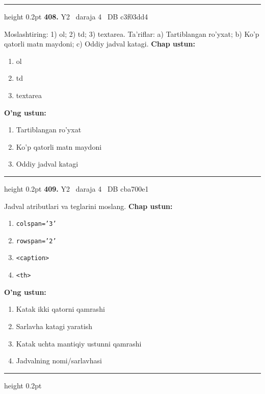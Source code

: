 \documentclass[10pt,a4paper,oneside]{article}
\begin{document}
\vspace{2mm}\hrule height 0.2pt \vspace{4mm}
\hypertarget{q408}{\textbf{\color{ink}408.}}  {\color{muted}\scriptsize Y2 \textbullet\ daraja 4 \textbullet\ DB c3f03dd4}
\par
Moslashtiring: 1) ol; 2) td; 3) textarea. Ta'riflar: a) Tartiblangan ro'yxat; b) Ko'p qatorli matn maydoni; c) Oddiy jadval katagi.
\textbf{\footnotesize Chap ustun:}
\begin{enumerate}[label=\arabic*),leftmargin=9mm]
\item ol
\item td
\item textarea
\end{enumerate}
\textbf{\footnotesize O'ng ustun:}
\begin{enumerate}[label=\Alph*),leftmargin=9mm]
\item Tartiblangan ro'yxat
\item Ko'p qatorli matn maydoni
\item Oddiy jadval katagi
\end{enumerate}
\vspace{2mm}\hrule height 0.2pt \vspace{4mm}
\hypertarget{q409}{\textbf{\color{ink}409.}}  {\color{muted}\scriptsize Y2 \textbullet\ daraja 4 \textbullet\ DB cba700e1}
\par
Jadval atributlari va teglarini moslang.
\textbf{\footnotesize Chap ustun:}
\begin{enumerate}[label=\arabic*),leftmargin=9mm]
\item \texttt{colspan='3'}
\item \texttt{rowspan='2'}
\item \texttt{\textless{}caption\textgreater{}}
\item \texttt{\textless{}th\textgreater{}}
\end{enumerate}
\textbf{\footnotesize O'ng ustun:}
\begin{enumerate}[label=\Alph*),leftmargin=9mm]
\item Katak ikki qatorni qamrashi
\item Sarlavha katagi yaratish
\item Katak uchta mantiqiy ustunni qamrashi
\item Jadvalning nomi/sarlavhasi
\end{enumerate}
\vspace{2mm}\hrule height 0.2pt \vspace{4mm}
\end{document}
